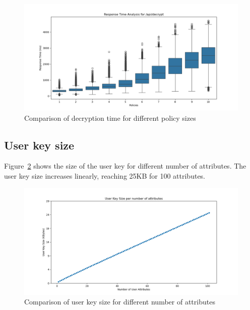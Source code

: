 \documentclass[cic,tc,english]{iiufrgs}
\begin{document}
                \begin{figure}
                    \centering
                    \includegraphics[width=\textwidth]{images/phase4/response_time_api_decrypt.png}
                    \caption{Comparison of decryption time for different policy sizes}
                    \label{fig:decrypt_policy_size}
                \end{figure}

        \subsection{User key size}
            \label{sec:keysize}
            Figure~\ref{fig:user_key_size} shows the size of the user key for different number of attributes. The user key size increases linearly, reaching 25KB for 100 attributes.


            \begin{figure}
                \centering
                \includegraphics[width=\textwidth]{images/key_size_analysis/user_key_size_analysis.png}
                \caption{Comparison of user key size for different number of attributes}
                \label{fig:user_key_size}
            \end{figure}
\end{document}
